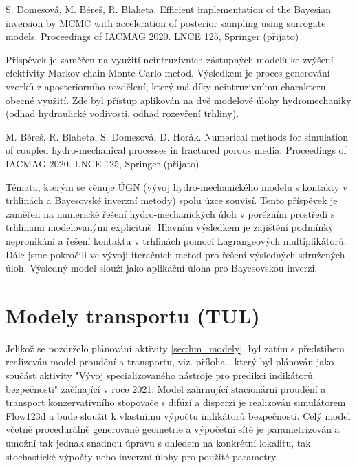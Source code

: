 \documentclass[11pt,a4paper]{article}
\begin{document}
\begin{onehalfspacing}
\vspace{2ex}
\noindent
S. Domesová, M. Béreš, R. Blaheta. Efficient implementation of the Bayesian inversion by MCMC with acceleration of posterior sampling using surrogate models. Proceedings of IACMAG 2020. LNCE 125, Springer (přijato)

Příspěvek je zaměřen na využití neintruzivních zástupných modelů ke zvýšení efektivity Markov chain Monte Carlo metod. Výsledkem je proces generování vzorků z aposteriorního rozdělení, který má díky neintruzivnímu charakteru obecné využití. Zde byl přístup aplikován na dvě modelové úlohy hydromechaniky (odhad hydraulické vodivosti, odhad rozevření trhliny).

\vspace{2ex}
\noindent
M. Béreš, R. Blaheta, S. Domesová, D. Horák. Numerical methods for simulation of coupled hydro-mechanical processes in fractured porous media. Proceedings of IACMAG 2020. LNCE 125, Springer (přijato)

Témata, kterým se věnuje ÚGN (vývoj hydro-mechanického modelu s kontakty v trhlinách a Bayesovské inverzní metody) spolu úzce souvisí. Tento příspěvek je zaměřen na numerické řešení hydro-mechanických úloh v porézním prostředí s trhlinami modelovanými explicitně. Hlavním výsledkem je zajištění podmínky nepronikání a řešení kontaktu v trhlinách pomocí Lagrangeových multiplikátorů. Dále jsme pokročili ve vývoji iteračních metod pro řešení výsledných sdružených úloh. Výsledný model slouží jako aplikační úloha pro Bayesovskou inverzi.



\section{Modely transportu (TUL)}
\label{sec:transport}

Jelikož se pozdrželo plánování aktivity \ref{sec:hm_modely}, byl zatím s předstihem realizován model proudění a transportu, 
viz. příloha , který byl plánován jako součást aktivity "Vývoj specializovaného nástroje pro predikci indikátorů bezpečnosti" začínající v roce 2021. Model zahrnující stacionární proudění a transport konzervativního stopovače s difúzí a disperzí je realizován simulátorem Flow123d a bude sloužit k vlastnímu výpočtu indikátorů bezpečnosti. Celý model včetně procedurálně generované geometrie a výpočetní sítě je parametrizován a umožní tak jednak snadnou úpravu s ohledem na konkrétní 
lokalitu, tak stochastické výpočty nebo inverzní úlohy pro použité parametry.


\end{onehalfspacing}
\end{document}
